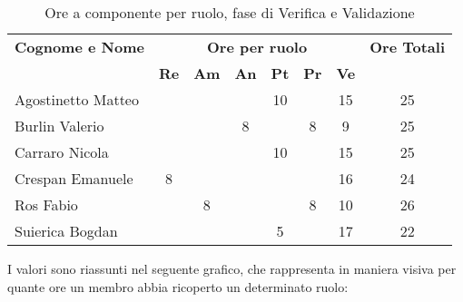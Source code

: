 \begin{table}[h]
	\centering
	\begin{tabular}{|l|c|c|c|c|c|c|c|}
		\toprule
		\textbf{Cognome e Nome} & \multicolumn{6}{c}{\textbf{Ore per ruolo}} & \textbf{Ore Totali} \\
		& \textbf{Re} & \textbf{Am} & \textbf{An} & \textbf{Pt} & \textbf{Pr} & \textbf{Ve} & \\
		
		\midrule
		Agostinetto Matteo & & & & 10 & & 15 & 25 \\
		Burlin Valerio & & & 8 & & 8 & 9 & 25 \\ 
		Carraro Nicola & & & & 10 & & 15 & 25 \\
		Crespan Emanuele & 8 & & & & & 16 & 24 \\
		Ros Fabio & & 8 & & & 8 & 10 & 26 \\
		Suierica Bogdan & & & & 5 & & 17 & 22 \\
		
		\bottomrule
	\end{tabular}
	\caption{Ore a componente per ruolo, fase di Verifica e Validazione}
\end{table}

\noindent I valori sono riassunti nel seguente grafico, che rappresenta in maniera visiva per quante ore un membro abbia ricoperto un determinato ruolo:

